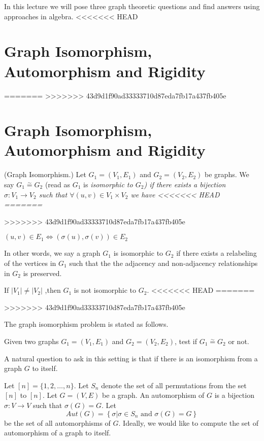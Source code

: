 
In this lecture we will pose three graph theoretic questions and find answers using approaches in algebra.
<<<<<<< HEAD


\section{Graph Isomorphism, Automorphism and Rigidity}
=======
>>>>>>> 43d9d1f90ad33333710d87eda7fb17a437fb405e

\section{Graph Isomorphism, Automorphism and Rigidity}

\begin{definition}(Graph Isomorphism.)
Let $G_1=(V_1,E_1)$ and $G_2=(V_2,E_2)$ be graphs. We say $G_1\stackrel{\sim}{=}G_2$ (read as $G_1$ is \em isomorphic to $G_2$) if there exists a bijection $\sigma : V_1\rightarrow V_2$ such that $\forall (u,v) \in V_1\times V_2$ we have
<<<<<<< HEAD
=======

>>>>>>> 43d9d1f90ad33333710d87eda7fb17a437fb405e
\begin{center}
$(u,v)\in E_1 \iff (\sigma(u),\sigma(v))\in E_2$
\end{center}
\end{definition}

In other words, we say a graph $G_1$ is isomorphic to $G_2$ if there exists a relabeling of the vertices in $G_1$  such that the the adjacency and non-adjacency relationships in $G_2$ is preserved. 
\begin{observation}
If $|V_1|\neq |V_2|$ ,then $G_1$ is not isomorphic to $G_2$.
<<<<<<< HEAD
=======

>>>>>>> 43d9d1f90ad33333710d87eda7fb17a437fb405e
\end{observation}

The graph isomorphism problem is stated as follows. 

\begin{problem}
Given two graphs $G_1=(V_1,E_1)$ and $G_2=(V_2,E_2)$, test if $G_1\stackrel{\sim}{=}G_2$ or not.
\end{problem}

A natural question to ask in this setting is that if there is an isomorphism from a graph $G$ to itself. 

Let $[n]=\{1,2,\ldots,n\}$. Let $S_n$ denote the set of all permutations from the set $[n]$ to $[n]$. Let $G=(V,E)$ be a graph. An automorphism of $G$ is a bijection $\sigma:V\rightarrow V$ such that $\sigma(G)= G$. Let
$$Aut(G)= \left\{\sigma | \sigma\in S_n \text{~and~} \sigma(G)= G \right\}$$
be the set of all automorphisms of $G$. Ideally, we would like to compute the set of automorphism of a graph to itself.

